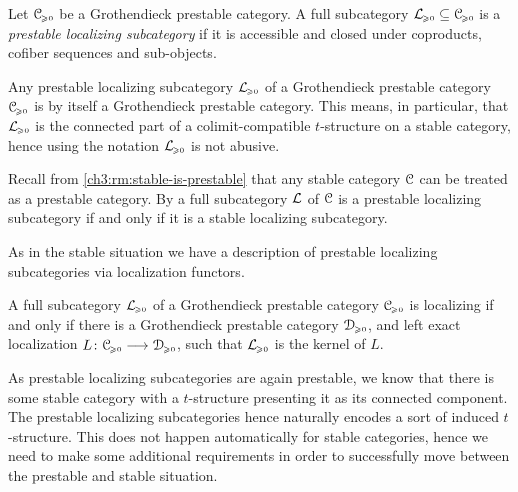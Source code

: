 \begin{definition}
    Let $\EuScript{C}_{\hspace{-1pt}\scriptscriptstyle\geqslant 0}$ be a Grothendieck prestable category. A full subcategory $\mathcal{L}_{\hspace{-1pt}\scriptscriptstyle\geqslant 0}\subseteq \EuScript{C}_{\hspace{-1pt}\scriptscriptstyle\geqslant 0}$ is a \emph{prestable localizing subcategory} if it is accessible and closed under coproducts, cofiber sequences and sub-objects. 
\end{definition}

\begin{remark}
    \label{ch3:rm:prestable-localizing-is-Grothendieck}
    Any prestable localizing subcategory $\mathcal{L}_{\hspace{-1pt}\scriptscriptstyle\geqslant 0}$ of a Grothendieck prestable category $\EuScript{C}_{\hspace{-1pt}\scriptscriptstyle\geqslant 0}$ is by \cite[C.5.2.1]{lurie_SAG} itself a Grothendieck prestable category. This means, in particular, that $\mathcal{L}_{\hspace{-1pt}\scriptscriptstyle\geqslant 0}$ is the connected part of a colimit-compatible $t$-structure on a stable category, hence using the notation $\mathcal{L}_{\hspace{-1pt}\scriptscriptstyle\geqslant 0}$ is not abusive. 
\end{remark}

\begin{remark}
    \label{ch3:rm:prestable-localizing-in-stable-then-stable-localizing}
    Recall from \cref{ch3:rm:stable-is-prestable} that any stable category $\EuScript{C}$ can be treated as a prestable category. By \cite[C.2.3.6]{lurie_SAG} a full subcategory $\mathcal{L}$ of $\EuScript{C}$ is a prestable localizing subcategory if and only if it is a stable localizing subcategory. 
\end{remark}

As in the stable situation we have a description of prestable localizing subcategories via localization functors. 

\begin{proposition}
    \label{ch3:prop:Lurie-prestable-localizing-left-exact-functor}
    A full subcategory $\mathcal{L}_{\hspace{-1pt}\scriptscriptstyle\geqslant 0}$ of a Grothendieck prestable category $\EuScript{C}_{\hspace{-1pt}\scriptscriptstyle\geqslant 0}$ is localizing if and only if there is a Grothendieck prestable category $\EuScript{D}_{\hspace{-1pt}\scriptscriptstyle\geqslant 0}$, and left exact localization $L\colon\EuScript{C}_{\hspace{-1pt}\scriptscriptstyle\geqslant 0}\longrightarrow\EuScript{D}_{\hspace{-1pt}\scriptscriptstyle\geqslant 0}$, such that $\mathcal{L}_{\hspace{-1pt}\scriptscriptstyle\geqslant 0}$ is the kernel of $L$. 
\end{proposition}















As prestable localizing subcategories are again prestable, we know that there is some stable category with a $t$-structure presenting it as its connected component. The prestable localizing subcategories hence naturally encodes a sort of induced $t$-structure. This does not happen automatically for stable categories, hence we need to make some additional requirements in order to successfully move between the prestable and stable situation. 

